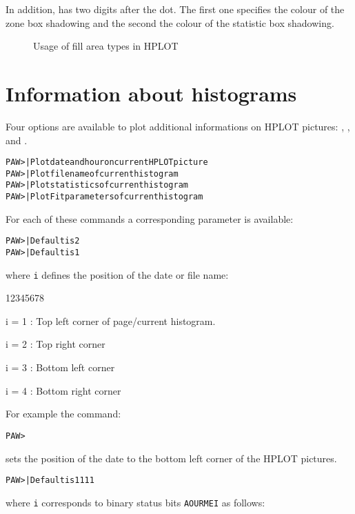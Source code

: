 In addition,  has two digits after the dot. The first one specifies
the colour of the zone box shadowing and the second the colour
of the statistic box shadowing. 

\begin{figure}[p]
\begin{center}\mbox{}\end{center}
\caption{Usage of fill area types in HPLOT}
\label{fig:BTYP}
\end{figure}
\clearpage

\section{Information about histograms}

Four options are available to plot additional informations on HPLOT pictures:
, ,  and .

\begin{alltt}
PAW >         | Plot date and hour on current HPLOT picture
PAW >         | Plot file name of current histogram
PAW >         | Plot statistics of current histogram
PAW >          | Plot Fit parameters of current histogram
\end{alltt}

For each of these  commands a corresponding 
 parameter is available:

\begin{alltt}
PAW >     | Default is 2
PAW >     | Default is 1
\end{alltt}
where \texttt{i} defines the position of the date or file name:

\begin{DLtt}{12345678}
\item[i = 1 :] Top left corner        of page/current histogram.
\item[i = 2 :] Top right corner
\item[i = 3 :] Bottom left corner
\item[i = 4 :] Bottom right corner
\end{DLtt}

For example the command:
\begin{alltt}
PAW > 
\end{alltt}
sets the position of the date to the bottom left corner of the HPLOT pictures.
\begin{alltt}
PAW >     | Default is 1111
\end{alltt}
where \texttt{i} corresponds to binary status bits \texttt{AOURMEI} as follows: 

